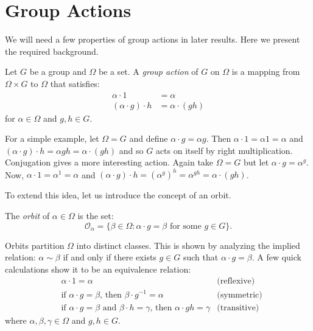 \documentclass[main.tex]{subfiles}
\begin{document}
\chapter{Group Actions}

We will need a few properties of group actions in later results. Here we present the required background.

\hss

\begin{definition}
Let $G$ be a group and $\Omega$ be a set. A \emph{group action} of $G$ on $\Omega$ is a mapping from $\Omega \times G$ to $\Omega$ that satisfies:
\begin{align*}
\alpha \cdot 1 &= \alpha \\
(\alpha \cdot g) \cdot h &= \alpha \cdot (gh)
\end{align*}
for $\alpha \in \Omega$ and $g, h \in G$.
\end{definition}

\hss

For a simple example, let $\Omega = G$ and define $\alpha \cdot g = \alpha g$. Then $\alpha \cdot 1 = \alpha 1 = \alpha$ and $(\alpha \cdot g) \cdot h = \alpha g h = \alpha \cdot (gh)$ and so $G$ acts on itself by right multiplication. Conjugation gives a more interesting action. Again take $\Omega = G$ but let $\alpha \cdot g = \alpha^g$. Now, $\alpha \cdot 1 = \alpha^1 = \alpha$ and $(\alpha \cdot g) \cdot h = (\alpha^g)^h = \alpha^{gh} = \alpha \cdot (gh)$.

To extend this idea, let us introduce the concept of an orbit.

\hss

\begin{definition}
The \emph{orbit} of $\alpha \in \Omega$ is the set:
$$\mathcal{O}_\alpha = \{ \beta \in \Omega : \alpha \cdot g = \beta \text{ for some } g \in G \}\text{.}$$
\end{definition}

\hss

Orbits partition $\Omega$ into distinct classes. This is shown by analyzing the implied relation: $\alpha \sim \beta$ if and only if there exists $g \in G$ such that $\alpha \cdot g = \beta$. A few quick calculations show it to be an equivalence relation:
\begin{align*}
&\alpha \cdot 1 = \alpha &\text{(reflexive)} \\
&\text{if } \alpha \cdot g = \beta \text{, then } \beta \cdot g^{-1} = \alpha &\text{(symmetric)} \\
&\text{if } \alpha \cdot g = \beta \text{ and } \beta \cdot h = \gamma \text{, then } \alpha \cdot gh = \gamma  &\text{(transitive)}
\end{align*}
where $\alpha, \beta, \gamma \in \Omega$ and $g, h \in G$.
\end{document}
